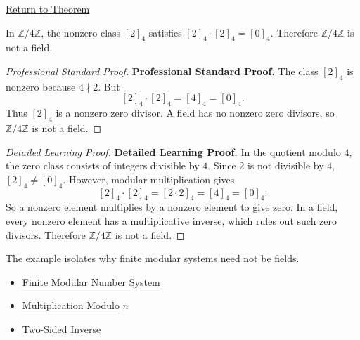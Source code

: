 \newpage
{}
\label{prf:z-mod-four-has-zero-divisors}

\begin{remark*}[Return]
\hyperref[thm:z-mod-four-has-zero-divisors]{Return to Theorem}
\end{remark*}

\begin{theorem*}
In \(\mathbb{Z}/4\mathbb{Z}\), the nonzero class \([2]_4\) satisfies
\([2]_4\cdot[2]_4=[0]_4\). Therefore \(\mathbb{Z}/4\mathbb{Z}\) is not a
field.
\end{theorem*}

\begin{proof}[Professional Standard Proof]
\LRAProofBodyStart
\textbf{Professional Standard Proof.}
The class \([2]_4\) is nonzero because \(4\nmid 2\). But
\[
[2]_4\cdot[2]_4=[4]_4=[0]_4.
\]
Thus \([2]_4\) is a nonzero zero divisor. A field has no nonzero zero
divisors, so \(\mathbb{Z}/4\mathbb{Z}\) is not a field.
\end{proof}

\begin{proof}[Detailed Learning Proof]
\LRAProofBodyStart
\textbf{Detailed Learning Proof.}
In the quotient modulo \(4\), the zero class consists of integers divisible
by \(4\). Since \(2\) is not divisible by \(4\), \([2]_4\neq[0]_4\). However,
modular multiplication gives
\[
[2]_4\cdot[2]_4=[2\cdot2]_4=[4]_4=[0]_4.
\]
So a nonzero element multiplies by a nonzero element to give zero. In a field,
every nonzero element has a multiplicative inverse, which rules out such zero
divisors. Therefore \(\mathbb{Z}/4\mathbb{Z}\) is not a field.
\end{proof}

\begin{remark*}
The example isolates why finite modular systems need not be fields.
\end{remark*}

\begin{dependencies}
\begin{itemize}
  \item \hyperref[def:finite-modular-number-system]{Finite Modular Number System}
  \item \hyperref[def:multiplication-modulo-n]{Multiplication Modulo \(n\)}
  \item \hyperref[def:two-sided-inverse]{Two-Sided Inverse}
\end{itemize}
\end{dependencies}

\clearpage
